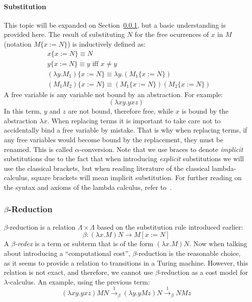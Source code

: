 \documentclass[11pt]{article}
\begin{document}
\paragraph{Substitution} This topic will be expanded on Section~\ref{reduction}, but a basic understanding is provided here.
The result of substituting $N$ for the free ocurrences of $x$ in $M$ (notation $M \{ x:= N \} $) is inductively defined as:
\begin{equation*}
  \begin{split}
    & x\{ x := N \} \equiv N \\
    & y \{ x := N \} \equiv y \text{ iff } x \neq y \\
    & (\lambda y.M_{1}) \{ x:=N \} \equiv \lambda y. ( M_{1} \{ x:=N \} ) \\
    & (M_{1}M_{2}) \{ x:=N \} \equiv (M_{1}\{ x:=N \} )(M_{2} \{ x:=N \} )
  \end{split}
\end{equation*}
A free variable is any variable not bound by an abstraction. For example:
\begin{equation*}
  (\lambda x y . y x z )
\end{equation*}
In this term, $y$ and $z$ are not bound, therefore free, while $x$ is bound by the abstraction $\lambda x$.
When replacing terms it is important to take care not to accidentally bind a free variable by mistake. That is why when replacing terms, if any free variables would become bound by the replacement, they must be renamed. This is called $\alpha$-conversion.
Note that we use braces to denote \textit{implicit} substitutions due to the fact that when introducing \textit{explicit} substitutions we will use the classical brackets, but when reading literature of the classical lambda-calculus, square brackets will mean implicit substitution.
For further reading on the syntax and axioms of the lambda calculus, refer to~\cite{barendregt1984lambda}.

\subsubsection{$\beta$-Reduction}\label{reduction}
$\beta$-reduction is a relation $\Lambda \times \Lambda$ based on the substitution rule introduced earlier:
\begin{equation}
  \beta : ( \lambda x.M ) N \rightarrow M [ x:=N ]
\end{equation}
A \textit{$\beta$-redex} is a term or subterm that is of the form $(\lambda x . M)N$.
Now when talking about introducing a \enquote{computational cost}, $\beta$-reduction is the reasonable choice, as it seems to provide a relation to transitions in a Turing machine. However, this relation is not exact, and therefore, we cannot use $\beta$-reduction as a cost model for $\lambda$-calculus.
An example, using the previous term:
\begin{equation*}
  ( \lambda xy. yxz ) M N \xrightarrow{1}_{\beta}  (\lambda y . y M z ) N \xrightarrow{1}_{\beta} N M z
\end{equation*}
\end{document}
